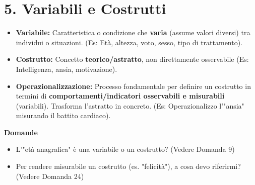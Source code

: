 \documentclass[12pt, a4paper]{article}
\newenvironment{reflectionbox}{%
    \medskip %
    \begin{framed}\par\noindent
    \textbf{\color{boxtitlecolor}Domande} \par
    \begin{itemize}[leftmargin=*, label=$\blacktriangleright$]
}{%
    \end{itemize}\par
    \end{framed}
    \medskip %
}
\begin{document}
\section*{5. Variabili e Costrutti}
\begin{itemize}
    \item \textbf{Variabile:} Caratteristica o condizione che \textbf{varia} (assume valori diversi) tra individui o situazioni. (Es: Età, altezza, voto, sesso, tipo di trattamento).
    \item \textbf{Costrutto:} Concetto \textbf{teorico/astratto}, non direttamente osservabile (Es: Intelligenza, ansia, motivazione).
    \item \textbf{Operazionalizzazione:} Processo fondamentale per definire un costrutto in termini di \textbf{comportamenti/indicatori osservabili e misurabili} (variabili). Trasforma l'astratto in concreto. (Es: Operazionalizzo l'"ansia" misurando il battito cardiaco).
\end{itemize}

\begin{reflectionbox}
    \item L'"età anagrafica" è una variabile o un costrutto? (Vedere Domanda 9)
    \item Per rendere misurabile un costrutto (es. "felicità"), a cosa devo riferirmi? (Vedere Domanda 24)
\end{reflectionbox}
\end{document}
